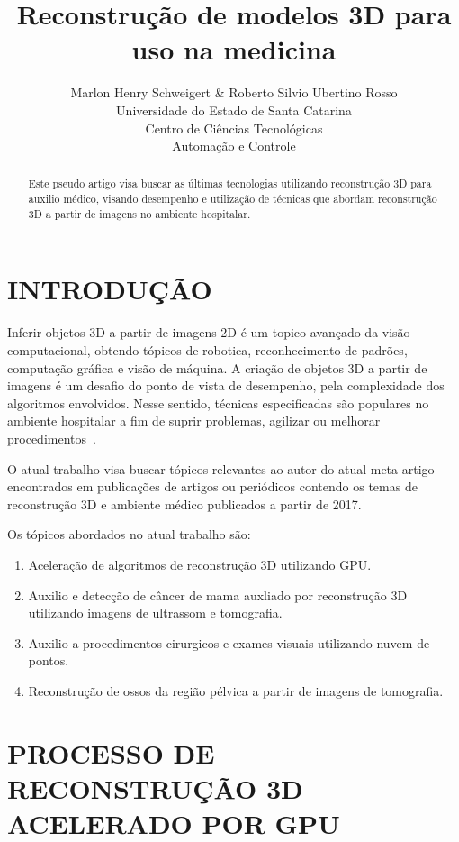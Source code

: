 \documentclass[letterpaper, 10 pt, conference]{ieeeconf}
\title{\LARGE \bf
Reconstrução de modelos 3D para uso na medicina
}
\author{
Marlon Henry Schweigert \& Roberto Silvio Ubertino Rosso
\\Universidade do Estado de Santa Catarina
\\Centro de Ciências Tecnológicas
\\Automação e Controle
}
\begin{document}
\maketitle
\thispagestyle{empty}
\pagestyle{empty}


\begin{abstract}
Este pseudo artigo visa buscar as últimas tecnologias utilizando reconstrução 3D para auxilio médico, visando desempenho e utilização de técnicas que abordam reconstrução 3D a partir de imagens no ambiente hospitalar.
\end{abstract}


\section{INTRODUÇÃO}


Inferir objetos 3D a partir de imagens 2D é um topico avançado da visão computacional, obtendo tópicos de robotica, reconhecimento de padrões, computação gráfica e visão de máquina.
%
A criação de objetos 3D a partir de imagens é um desafio do ponto de vista de desempenho, pela complexidade dos algoritmos envolvidos.
%
Nesse sentido, técnicas especificadas são populares no ambiente hospitalar a fim de suprir problemas, agilizar ou melhorar procedimentos~\cite{sue2017}.

O atual trabalho visa buscar tópicos relevantes ao autor do atual meta-artigo encontrados em publicações de artigos ou periódicos contendo os temas de reconstrução 3D e ambiente médico publicados a partir de 2017.

Os tópicos abordados no atual trabalho são:
\begin{enumerate}
  \item Aceleração de algoritmos de reconstrução 3D utilizando GPU.
  \item Auxilio e detecção de câncer de mama auxliado por reconstrução 3D utilizando imagens de ultrassom e tomografia.
  \item Auxilio a procedimentos cirurgicos e exames visuais utilizando nuvem de pontos.
  \item Reconstrução de ossos da região pélvica a partir de imagens de tomografia.
\end{enumerate}

\section{PROCESSO DE RECONSTRUÇÃO 3D ACELERADO POR GPU}
\end{document}
